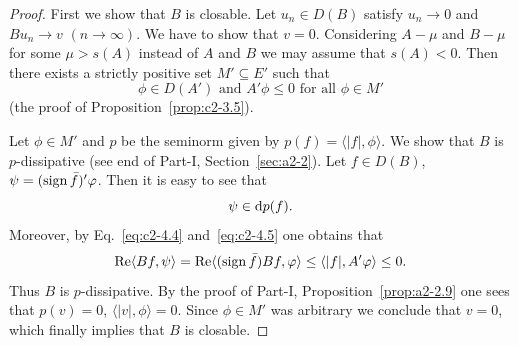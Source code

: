 \begin{proof}
First we show that $B$ is closable.
Let $u_{n} \in D(B)$ satisfy $u_{n} \to 0$ and $Bu_{n} \to v$ $(n \to \infty)$.
We have to
show that $v = 0$. 
Considering $A - \mu$ and $B - \mu$ for some $\mu > s(A)$ instead of\/ $A$ and $B$ we may assume that $s(A) < 0$. 
Then there exists a strictly positive set $M' \subseteq E'$ such that
\begin{equation}\label{eq:c2-4.5}
\phi \in D(A') \text{ and } A'\phi \leq 0 \text{ for all } \phi \in M'
\end{equation}
(\cf the proof of Proposition~\ref{prop:c2-3.5}).

Let $\phi \in M'$ and $p$ be the seminorm given by $p(f) = \langle|f|,\phi\rangle$. 
We show that $B$ is $p$-dissipative (see end of Part-I, Section~\ref{sec:a2-2}).
Let $f \in D(B)$, $\psi = (\sign  \bar{f})'\phi$. 
Then it is easy to see that 
\[
\psi \in \mathop{}\!\mathrm{d}{p}(f) .
\]
Moreover, by Eq.~\eqref{eq:c2-4.4} and~\eqref{eq:c2-4.5} one obtains that 
\[
\Re\langle Bf,\psi\rangle = \Re\langle(\sign  \bar{f})Bf,\phi\rangle \leq \langle|f|,A'\phi\rangle \leq 0 .
\]
Thus $B$ is $p$-dissipative. 
By the proof of Part-I, Proposition~\ref{prop:a2-2.9} 
one sees that $p(v) = 0$, \ie $\langle|v|,\phi\rangle = 0$.
Since $\phi \in M'$ was arbitrary we conclude that $v = 0$, which finally implies that $B$ is closable.


\end{proof}
